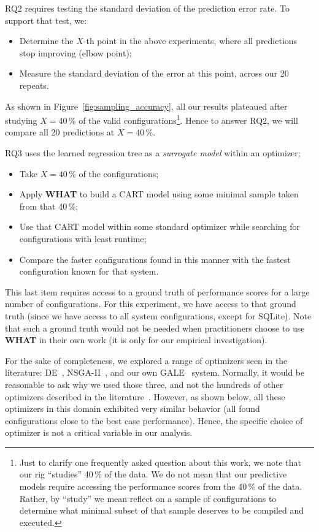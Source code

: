 \documentclass[smallextended]{svjour3}       %
\newcommand{\bi}{\begin{itemize}}%
\newcommand{\ei}{\end{itemize}}
\newcommand{\what}{{\bf WHAT}\xspace}
\begin{document}
RQ2 requires testing the standard deviation of the prediction error rate. To support that test, we:
\begin{itemize}
\item Determine the $X$-th point in the above experiments, where all predictions stop improving (elbow point);
\item Measure the standard deviation of the error at this point, across our 20 repeats.
\end{itemize}
As shown in Figure~\ref{fig:sampling_accuracy}, all our results plateaued after studying $X=40$\,\% of the valid configurations\footnote{Just to clarify one frequently asked question about this work, we note
that our rig ``studies'' 40\,\% of the data. We do not mean that our predictive models
 require accessing the performance scores from the 40\,\% of the data. Rather, by ``study'' we mean   reflect 
 on a sample of configurations to determine what minimal subset of that
sample deserves to be compiled and executed.}.
 Hence to answer { RQ2}, we will compare all 20 predictions at $X=40$\,\%.
 
{ RQ3}   uses the learned regression tree as a {\em surrogate model} within an optimizer; 
\bi
\item Take   $X=40\,\%$ of the configurations;
\item Apply \what to build a CART model using some minimal sample taken from that 40\,\%;
\item Use that CART model within some standard optimizer while searching for 
configurations with least runtime;
\item  Compare the faster configurations found in this manner with the fastest configuration
known for that system.
\ei
This last item requires access to a ground truth of performance scores for a  
large number of configurations. For this experiment, we have access to that ground truth
(since we have access to all system configurations, except for SQLite). Note that such a ground truth
would not be needed when practitioners choose to use \what in their own work (it is only for our empirical investigation).


For the sake of completeness, we explored
a range of optimizers seen in the   literature:  DE~\cite{storn1997differential}, NSGA-II~\cite{deb00afast},
and our own GALE~\cite{krall2014gale,zuluaga2013active} system.   Normally,
it would be  reasonable to ask
why we used those three, and not the hundreds of other 
optimizers described in the literature~\cite{fletcher13,harman12}. However,
as shown below, all these optimizers in this
domain exhibited  very similar
behavior (all found configurations close to the
best case performance). Hence, the specific
choice of optimizer is not a critical
variable in  our analysis.
\end{document}
